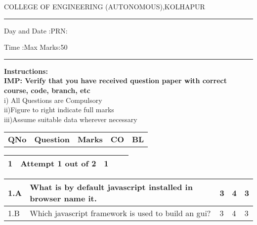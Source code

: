 \documentclass[12pt]{article}
\begin{document}
		\par
	COLLEGE OF ENGINEERING (AUTONOMOUS),KOLHAPUR
	\par\noindent\rule{\textwidth}{0.4pt}
	\centering{}\par
\centering{}\par
{}\par
\begin{flushleft}
	Day and Date :{}\hspace{5.5cm}PRN:
\end{flushleft}

\begin{flushleft}
	Time :{}\hspace{7cm}Max Marks:{50}\\
\end{flushleft}
\noindent\rule{\textwidth}{0.1pt}
\begin{flushleft}
	{\bf Instructions:}\\
	{\hspace{0.5cm} \bf IMP: Verify that you have received question paper with correct course, code, branch, etc}\\
	\hspace{1cm}i) All Questions are Compulsory\\
	\hspace{1cm}ii)Figure to right indicate full marks\\
	\hspace{1cm}iii)Assume suitable data wherever necessary\\
\end{flushleft} 

\begin{tabular}{L{1cm}C{9cm}C{2cm}C{2cm}C{1cm}}
	\bf{QNo} & 
	\bf{Question}
	
	&
	\bf{Marks}&
	\bf{CO}&
	\bf{BL}
	
	
	
\end{tabular}

		\begin{tabular}{L{1cm}L{9cm}C{2cm}C{2cm}C{1cm}}
		\bf1 & Attempt 1 out of 2 & 1 & & \\ \hline
	\end{tabular}

	
	
	\begin{tabular}{|L{1cm}|L{9cm}|C{2cm}|C{2cm}|C{1cm}|}
				1.A &
	What is by default javascript installed in browser name it. &  3 & 4 & 3\\ \hline
		1.B &
	Which javascript framework is used to build an gui? &  3 & 4 & 3\\ \hline
		\end{tabular}
\end{document}
